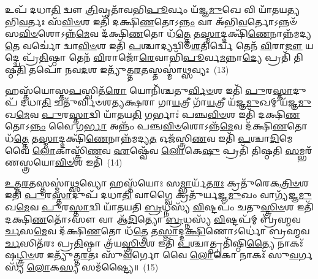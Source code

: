 𑌉𑌪᳴ 𑌦𑌧𑌾\-\ul{𑌤𑌿} 𑌦𑍍𑌵𑍗 \ul{𑌤𑍍𑌰𑌿}\-𑌵𑍃𑌤𑌾᳴𑌵𑌭𑌿\-\ul{𑌪𑍂}\-𑌰𑍍𑌵𑌂 𑌯᳴𑌜𑍍𑌞\-\ul{𑌮𑍁}\-𑌖𑍇 𑌵𑌿 𑌯𑌾᳴𑌤𑌯𑌤𑍍𑌯𑌭𑌿\-\ul{𑌵}\-𑌰𑍍𑌤𑌃 𑌸᳴\-\ul{𑌵𑌿}\-\-\ul{𑍞}\-𑌶 𑌇𑌤𑌿᳴ 𑌦𑌕𑍍𑌷𑌿\-\ul{𑌣}\-𑌤𑍋\-𑌽\-\ul{𑌨𑍍𑌨𑌂} 𑌵𑌾 𑌅᳴𑌭𑌿\-\ul{𑌵}\-𑌰𑍍𑌤𑍋\-𑌽𑌨𑍍𑌨𑍞᳴ 𑌸\-\ul{𑌵𑌿}\-\-\ul{𑍞}\-𑌶𑍋\-𑌽𑌨𑍍𑌨᳴\-\ul{𑌮𑍇}\-𑌵 𑌦᳴𑌕𑍍𑌷𑌿\-\ul{𑌣}\-𑌤𑍋 𑌧᳴\-\ul{𑌤𑍍𑌤𑍇} 𑌤\-\ul{𑌸𑍍𑌮𑌾}\-𑌦𑍍𑌦𑌕𑍍𑌷𑌿᳴\-\ul{𑌣𑍇}\-𑌨𑌾𑌨𑍍𑌨᳴𑌮𑌦𑍍𑌯\-\ul{𑌤𑍇} 𑌵𑌰𑍍𑌚𑍋॑ 𑌦𑍍𑌵𑌾\-\ul{𑌵𑌿}\-\-\ul{𑍞}\-𑌶 𑌇𑌤𑌿᳴ \ul{𑌪}\-𑌶𑍍𑌚𑌾𑌦𑍍𑌯𑌦𑍍𑌵𑌿𑍞᳴\-\ul{𑌶}\-𑌤𑌿𑌰𑍍𑌦𑍍𑌵𑍇 𑌤𑍇𑌨᳴ \ul{𑌵𑌿}\-𑌰𑌾\-\ul{𑌜𑍗} 𑌯𑌦𑍍𑌦𑍍𑌵𑍇 𑌪𑍍𑌰᳴\-\ul{𑌤𑌿}\-𑌷𑍍𑌠𑌾 𑌤𑍇𑌨᳴ \ul{𑌵𑌿}\-𑌰𑌾𑌜𑍋᳴\-\ul{𑌰𑍇}\-𑌵𑌾𑌭𑌿᳴\-\ul{𑌪𑍂}\-𑌰𑍍𑌵\-\ul{𑌮}\-𑌨𑍍𑌨𑌾\-\ul{𑌦𑍍𑌯𑍇} 𑌪𑍍𑌰𑌤𑌿᳴ 𑌤𑌿𑌷𑍍𑌠\-\ul{𑌤𑌿} 𑌤𑌪𑍋᳴ 𑌨𑌵\-\ul{𑌦}\-𑌶 𑌇𑌤𑍍𑌯𑍁᳴𑌤𑍍𑌤\-\ul{𑌰}\-𑌤𑌸𑍍𑌤𑌸𑍍𑌮𑌾॑\-\ul{𑌥𑍍𑌸}\-𑌵𑍍𑌯𑌃~(13)

𑌹𑌸𑍍𑌤᳴𑌯𑍋𑌸𑍍𑌤\-\ul{𑌪}\-𑌸𑍍𑌵𑌿𑌤᳴\-\ul{𑌰𑍋} 𑌯𑍋𑌨𑌿᳴𑌶𑍍𑌚𑌤𑍁\-\ul{𑌰𑍍𑌵𑌿}\-\-\ul{𑍞}\-𑌶 𑌇𑌤𑌿᳴ \ul{𑌪𑍁}\-𑌰\-\ul{𑌸𑍍𑌤𑌾}\-𑌦𑍁𑌪᳴ 𑌦𑌧𑌾\-\ul{𑌤𑌿} 𑌚𑌤𑍁᳴𑌰𑍍𑌵𑌿𑍞𑌶𑌤𑍍𑌯𑌕𑍍𑌷𑌰𑌾 𑌗𑌾\-\ul{𑌯}\-𑌤𑍍𑌰𑍀 𑌗𑌾᳴\-\ul{𑌯}\-𑌤𑍍𑌰𑍀 𑌯᳴𑌜𑍍𑌞\-\ul{𑌮𑍁}\-𑌖𑌮𑍍 𑌯᳴𑌜𑍍𑌞\-\ul{𑌮𑍁}\-𑌖\-\ul{𑌮𑍇}\-𑌵 \ul{𑌪𑍁}\-𑌰\-\ul{𑌸𑍍𑌤𑌾}\-𑌦𑍍𑌵𑌿 𑌯𑌾᳴𑌤𑌯\-\ul{𑌤𑌿} 𑌗𑌰𑍍𑌭𑌾𑌃॑ 𑌪𑌞𑍍𑌚\-\ul{𑌵𑌿}\-\-\ul{𑍞}\-𑌶 𑌇𑌤𑌿᳴ 𑌦𑌕𑍍𑌷𑌿\-\ul{𑌣}\-𑌤𑍋\-𑌽\-\ul{𑌨𑍍𑌨𑌂} 𑌵𑍈 𑌗\-\ul{𑌰𑍍𑌭𑌾} 𑌅𑌨𑍍𑌨𑌂᳴ 𑌪𑌞𑍍𑌚\-\ul{𑌵𑌿}\-\-\ul{𑍞}\-𑌶𑍋\-𑌽𑌨𑍍𑌨᳴\-\ul{𑌮𑍇}\-𑌵 𑌦᳴𑌕𑍍𑌷𑌿\-\ul{𑌣}\-𑌤𑍋 𑌧᳴\-\ul{𑌤𑍍𑌤𑍇} 𑌤\-\ul{𑌸𑍍𑌮𑌾}\-𑌦𑍍𑌦𑌕𑍍𑌷𑌿᳴\-\ul{𑌣𑍇}\-𑌨𑌾𑌨𑍍𑌨᳴𑌮𑌦𑍍𑌯\-\ul{𑌤} 𑌓𑌜᳴𑌸𑍍𑌤𑍍𑌰𑌿\-\ul{𑌣}\-𑌵 𑌇𑌤𑌿᳴ \ul{𑌪}\-𑌶𑍍𑌚𑌾\-\ul{𑌦𑌿}\-𑌮𑍇 𑌵𑍈 \ul{𑌲𑍋}\-𑌕𑌾𑌸𑍍𑌤𑍍𑌰𑌿᳴\-\ul{𑌣}\-𑌵 \ul{𑌏}\-𑌷𑍍𑌵𑍇᳴𑌵 \ul{𑌲𑍋}\-𑌕𑍇\-\ul{𑌷𑍁} 𑌪𑍍𑌰𑌤𑌿᳴ 𑌤𑌿𑌷𑍍𑌠𑌤𑌿 \ul{𑌸}\-𑌮𑍍𑌭𑌰᳴𑌣𑌸𑍍𑌤𑍍𑌰𑌯𑍋\-\ul{𑌵𑌿}\-\-\ul{𑍞}\-𑌶 𑌇𑌤𑌿᳴~(14)

\-\ul{𑌉}\-\-\ul{𑌤𑍍𑌤}\-\-\ul{𑌰}\-𑌤𑌸𑍍𑌤𑌸𑍍𑌮𑌾॑\-\ul{𑌥𑍍𑌸}\-𑌵𑍍𑌯𑍋 𑌹𑌸𑍍𑌤᳴𑌯𑍋𑌃 𑌸\-\ul{𑌮𑍍𑌭𑌾}\-𑌰𑍍𑌯᳴𑌤\-\ul{𑌰𑌃} 𑌕𑍍𑌰𑌤𑍁᳴𑌰𑍇𑌕\-\ul{𑌤𑍍𑌰𑌿}\-\-\ul{𑍞}\-𑌶 𑌇𑌤𑌿᳴ \ul{𑌪𑍁}\-𑌰\-\ul{𑌸𑍍𑌤𑌾}\-𑌦𑍁𑌪᳴ 𑌦𑌧𑌾\-\ul{𑌤𑌿} 𑌵𑌾𑌗𑍍𑌵𑍈 𑌕𑍍𑌰𑌤𑍁᳴𑌰𑍍𑌯𑌜𑍍𑌞\-\ul{𑌮𑍁}\-𑌖𑌂 𑌵𑌾𑌗𑍍𑌯᳴𑌜𑍍𑌞\-\ul{𑌮𑍁}\-𑌖\-\ul{𑌮𑍇}\-𑌵 \ul{𑌪𑍁}\-𑌰\-\ul{𑌸𑍍𑌤𑌾}\-𑌦𑍍𑌵𑌿 𑌯𑌾᳴𑌤𑌯𑌤𑌿 \ul{𑌬𑍍𑌰}\-𑌧𑍍𑌨𑌸𑍍𑌯᳴ \ul{𑌵𑌿}\-𑌷𑍍𑌟𑌪𑌂᳴ 𑌚𑌤𑍁\-\ul{𑌸𑍍𑌤𑍍𑌰𑌿}\-\-\ul{𑍞}\-𑌶 𑌇𑌤𑌿᳴ 𑌦𑌕𑍍𑌷𑌿\-\ul{𑌣}\-𑌤𑍋᳴\-𑌽𑌸𑍗 𑌵𑌾 𑌆᳴\-\ul{𑌦𑌿}\-𑌤𑍍𑌯𑍋 \ul{𑌬𑍍𑌰}\-𑌧𑍍𑌨𑌸𑍍𑌯᳴ \ul{𑌵𑌿}\-𑌷𑍍𑌟𑌪᳴𑌮𑍍 𑌬𑍍𑌰𑌹𑍍𑌮𑌵\-\ul{𑌰𑍍𑌚}\-𑌸\-\ul{𑌮𑍇}\-𑌵 𑌦᳴𑌕𑍍𑌷𑌿\-\ul{𑌣}\-𑌤𑍋 𑌧᳴\-\ul{𑌤𑍍𑌤𑍇} 𑌤\-\ul{𑌸𑍍𑌮𑌾}\-𑌦𑍍𑌦\-\ul{𑌕𑍍𑌷𑌿}\-𑌣𑍋\-𑌽𑌰𑍍𑌧𑍋॑ 𑌬𑍍𑌰𑌹𑍍𑌮𑌵\-\ul{𑌰𑍍𑌚}\-𑌸𑌿𑌤᳴𑌰𑌃 𑌪𑍍𑌰\-\ul{𑌤𑌿}\-𑌷𑍍𑌠𑌾 𑌤𑍍𑌰᳴𑌯\-\ul{𑌸𑍍𑌤𑍍𑌰𑌿}\-\-\ul{𑍞}\-𑌶 𑌇𑌤𑌿᳴ \ul{𑌪}\-𑌶𑍍𑌚𑌾𑌤𑍍𑌪𑍍𑌰𑌤𑌿᳴𑌷𑍍𑌠𑌿\-\ul{𑌤𑍍𑌯𑍈} 𑌨𑌾𑌕𑌃᳴ 𑌷\-\ul{𑌟𑍍𑌤𑍍𑌰𑌿}\-\-\ul{𑍞}\-𑌶 𑌇𑌤𑍍𑌯𑍁᳴𑌤𑍍𑌤\-\ul{𑌰}\-𑌤𑌃 𑌸𑍁᳴\-\ul{𑌵}\-𑌰𑍍𑌗𑍋 𑌵𑍈 \ul{𑌲𑍋}\-𑌕𑍋 𑌨𑌾𑌕𑌃᳴ 𑌸𑍁\-\ul{𑌵}\-𑌰𑍍𑌗𑌸𑍍𑌯᳴ \ul{𑌲𑍋}\-𑌕\-\ul{𑌸𑍍𑌯} 𑌸𑌮᳴𑌷𑍍𑌟𑍍𑌯𑍈॥~(15)

{\anuvakamend[{𑌵𑍈 \ul{𑌤𑍍𑌰𑌿}\-𑌵𑍃𑌦𑌿𑌤𑌿᳴ \ul{𑌪𑍁}\-𑌰𑌸𑍍𑌤𑌾॑\-\ul{𑌥𑍍𑌸}\-𑌵𑍍𑌯𑌸𑍍𑌤𑍍𑌰᳴𑌯𑍋\-\ul{𑌵𑌿}\-\-\ul{𑍞}\-𑌶 𑌇𑌤𑌿᳴ 𑌸𑍁\-\ul{𑌵}\-𑌰𑍍𑌗𑍋 𑌵𑍈 𑌪𑌞𑍍𑌚᳴ 𑌚}]}%


